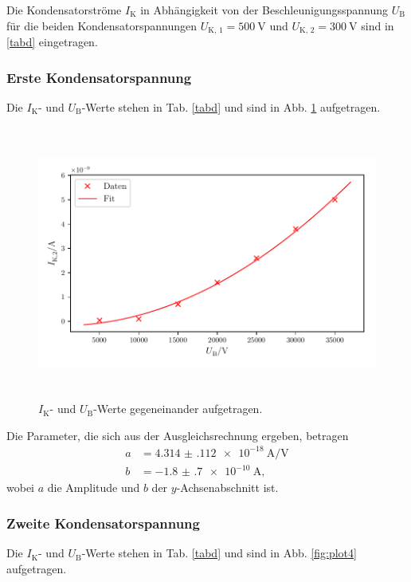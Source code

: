 Die Kondensatorströme $I_\text{K}$ in Abhängigkeit von der
Beschleunigungsspannung $U_\text{B}$ für die beiden Kondensatorspannungen
$U_\text{K, 1} = \SI{500}{\volt}$ und $U_\text{K, 2} = \SI{300}{\volt}$
sind in \ref{tabd} eingetragen.

\subsubsection{Erste Kondensatorspannung}
Die $I_\text{K}$- und $U_\text{B}$-Werte stehen in Tab. \ref{tabd} und sind in Abb. \ref{fig:plot3} aufgetragen. 



\begin{figure}
    \centering
    \includegraphics[width=15cm, height=9cm]{build/plot3.pdf}
    \caption{$I_\text{K}$- und $U_\text{B}$-Werte gegeneinander aufgetragen.}
    \label{fig:plot3}
\end{figure}

\noindent Die Parameter, die sich aus der Ausgleichsrechnung ergeben, betragen
\begin{align*}
    a &= \SI{4.314(112)e-18}{\ampere\per\volt}\\
    b &= \SI{-1.8(7)e-10}{\ampere},
\end{align*}
wobei $a$ die Amplitude und $b$ der $y$-Achsenabschnitt ist. 

\subsubsection{Zweite Kondensatorspannung}
Die $I_\text{K}$- und $U_\text{B}$-Werte stehen in Tab. \ref{tabd} und sind in Abb. \ref{fig:plot4} aufgetragen. 

